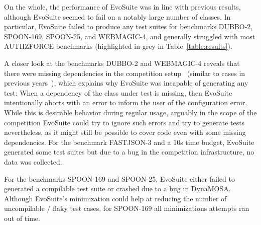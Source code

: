 \documentclass[sigconf,table]{acmart}
\newcommand{\EVOSUITE}{{\sc EvoSuite}\xspace}
\begin{document}


On the whole, the performance of \EVOSUITE was in line with previous
results, although \EVOSUITE seemed to fail on a notably large number
of classes. In particular, \EVOSUITE failed to produce any test
suites for benchmarks DUBBO-2, SPOON-169, SPOON-25, and WEBMAGIC-4,
and generally struggled with most AUTHZFORCE benchmarks (highlighted
in grey in Table~\ref{table:results}).

A closer look at the benchmarks DUBBO-2 and WEBMAGIC-4 reveals that
there were missing dependencies in the competition
setup~\cite{sbst19competition} (similar to cases in previous
years~\cite{evosuiteAtSbst2018}), which explains why \EVOSUITE was
incapable of generating any test: When a dependency of the class
under test is missing, then \EVOSUITE intentionally aborts with an
error to inform the user of the configuration error. While this is
desirable behavior during regular usage, arguably in the scope of the
competition \EVOSUITE could try to ignore such errors and try to
generate tests nevertheless, as it might still be possible to cover
code even with some missing dependencies. For the benchmark
FASTJSON-3 and a 10s time budget, \EVOSUITE generated some test
suites but due to a bug in the
competition infrastructure, no data was collected. %

For the benchmarks SPOON-169 and SPOON-25, \EVOSUITE either failed to generated
a compilable test suite or crashed due to a bug in DynaMOSA. Although \EVOSUITE's
minimization could help at reducing the number of uncompilable / flaky test cases,
for SPOON-169 all minimizations attempts ran out of time.
\end{document}
